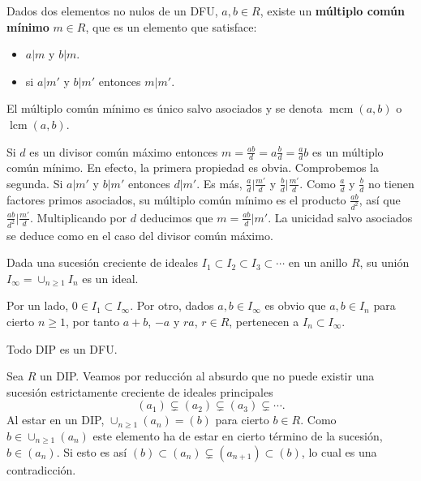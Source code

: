 
Dados dos elementos no nulos de un DFU, \(a,b\in R\), existe un
\textbf{múltiplo común mínimo} \(m\in R\), que es un elemento que
satisface:

\begin{itemize}
\item
  \(a|m\) y \(b|m\).
\item
  si \(a|m'\) y \(b|m'\) entonces \(m|m'\).
\end{itemize}

El múltiplo común mínimo es único salvo asociados y se denota
\(\operatorname{mcm}(a,b)\) o \(\operatorname{lcm}(a,b)\).


Si \(d\) es un divisor común máximo entonces
\(m=\frac{ab}{d}=a\frac{b}{d}=\frac{a}{d}b\) es un múltiplo común
mínimo. En efecto, la primera propiedad es obvia. Comprobemos la
segunda. Si \(a|m'\) y \(b|m'\) entonces \(d|m'\). Es más,
\(\frac{a}{d}|\frac{m'}{d}\) y \(\frac{b}{d}|\frac{m'}{d}\). Como
\(\frac{a}{d}\) y \(\frac{b}{d}\) no tienen factores primos asociados,
su múltiplo común mínimo es el producto \(\frac{ab}{d^2}\), así que
\(\frac{ab}{d^2}|\frac{m'}{d}\). Multiplicando por \(d\) deducimos que
\(m=\frac{ab}{d}|m'\). La unicidad salvo asociados se deduce como en el
caso del divisor común máximo. 


Dada una sucesión creciente de ideales
\(I_1\subset I_2\subset I_3\subset\cdots\) en un anillo \(R\), su
unión \(I_\infty=\cup_{n\geq 1}I_n\) es un ideal. 


Por un lado, \(0\in I_1\subset I_{\infty}\). Por otro, dados
\(a,b\in I_\infty\) es obvio que \(a,b\in I_n\) para cierto
\(n\geq 1\), por tanto \(a+b\), \(-a\) y \(ra\), \(r\in R\), pertenecen
a \(I_n\subset I_\infty\). 


Todo DIP es un DFU. 


Sea \(R\) un DIP. Veamos por reducción al absurdo que no puede existir
una sucesión estrictamente creciente de ideales principales
\[(a_1)\subsetneq(a_2)\subsetneq(a_3)\subsetneq\cdots.\] Al estar en un
DIP, \(\cup_{n\geq 1}(a_n)=(b)\) para cierto \(b\in R\). Como
\(b\in \cup_{n\geq 1}(a_n)\) este elemento ha de estar en cierto
término de la sucesión, \(b\in (a_n)\). Si esto es así
\((b)\subset (a_n)\subsetneq (a_{n+1})\subset (b)\), lo cual es una
contradicción.


